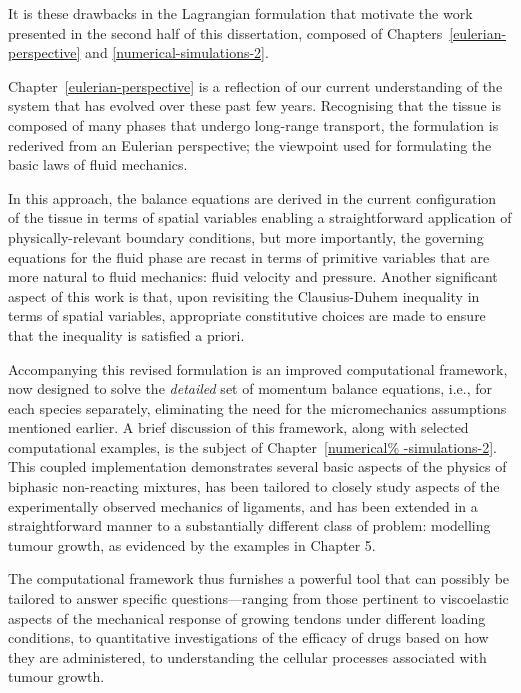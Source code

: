 It is these drawbacks in the Lagrangian formulation that motivate the
work presented in the second half of this dissertation, composed of
Chapters~\ref{eulerian-perspective} and \ref{numerical-simulations-2}.

Chapter~\ref{eulerian-perspective} is a reflection of our current
understanding of the system that has evolved over these past few
years. Recognising that the tissue is composed of many phases that
undergo long-range transport, the formulation is rederived from an
Eulerian perspective; the viewpoint used for formulating the basic
laws of fluid mechanics.

In this approach, the balance equations are derived in the current
configuration of the tissue in terms of spatial variables enabling a
straightforward application of physically-relevant boundary
conditions, but more importantly, the governing equations for the
fluid phase are recast in terms of primitive variables that are more
natural to fluid mechanics: fluid velocity and pressure. Another
significant aspect of this work is that, upon revisiting the
Clausius-Duhem inequality in terms of spatial variables, appropriate
constitutive choices are made to ensure that the inequality is
satisfied a priori.

Accompanying this revised formulation is an improved computational
framework, now designed to solve the {\em detailed} set of momentum
balance equations, i.e., for each species separately, eliminating the
need for the micromechanics assumptions mentioned earlier. A brief
discussion of this framework, along with selected computational
examples, is the subject of Chapter~\ref{numerical%
  -simulations-2}. This coupled implementation demonstrates several
basic aspects of the physics of biphasic non-reacting mixtures, has
been tailored to closely study aspects of the experimentally observed
mechanics of ligaments, and has been extended in a straightforward
manner to a substantially different class of problem: modelling tumour
growth, as evidenced by the examples in Chapter 5.

The computational framework thus furnishes a powerful tool that can
possibly be tailored to answer specific questions---ranging from those
pertinent to viscoelastic aspects of the mechanical response of
growing tendons under different loading conditions, to quantitative
investigations of the efficacy of drugs based on how they are
administered, to understanding the cellular processes associated with
tumour growth.

